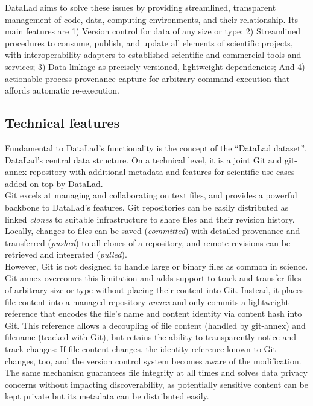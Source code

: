 {DataLad aims to solve these issues by providing streamlined, transparent management of code, data, computing environments, and their relationship.
Its main features are 1) Version control for data of any size or type; 2) Streamlined procedures to consume, publish, and update  all elements of scientific projects, with interoperability adapters to established scientific and commercial tools and services; 3) Data linkage as precisely versioned, lightweight dependencies; And 4) actionable process provenance capture for arbitrary command execution that affords automatic re-execution.

\subsection{Technical features}

Fundamental to DataLad's functionality is the concept of the ``DataLad dataset'', DataLad's central data structure.
On a technical level, it is a joint Git and git-annex repository with additional metadata and features for scientific use cases added on top by DataLad.\\
Git excels at managing and collaborating on text files, and provides a powerful backbone to DataLad's features.
Git repositories can be easily distributed as linked \textit{clones} to suitable infrastructure to share files and their revision history.
Locally, changes to files can be saved (\textit{committed}) with detailed provenance and transferred (\textit{pushed}) to all clones of a repository, and remote revisions can be retrieved and integrated (\textit{pulled}).\\
However, Git is not designed to handle large or binary files as common in science.
Git-annex overcomes this limitation and adds support to track and transfer files of arbitrary size or type without placing their content into Git.
Instead, it places file content into a managed repository \textit{annex} and only commits a lightweight reference that encodes the file's name and content identity via content hash into Git.
This reference allows a decoupling of file content (handled by git-annex) and filename (tracked with Git), but retains the ability to transparently notice and track changes: If file content changes, the identity reference known to Git changes, too, and the version control system becomes aware of the modification.
The same mechanism guarantees file integrity at all times and solves data privacy concerns without impacting discoverability, as potentially sensitive content can be kept private but its metadata can be distributed easily.
}
